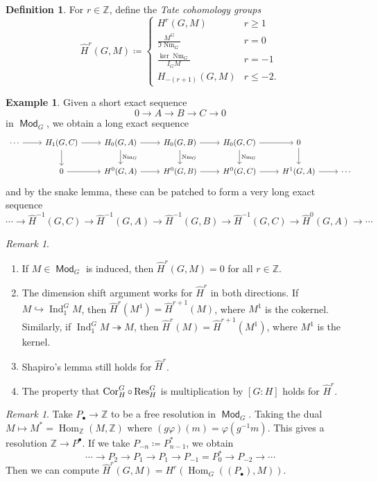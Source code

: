 \documentclass[leqno, openany]{memoir}
\theoremstyle{definition}
\newtheorem{defn}[thm]{Definition}
\newtheorem{exm}[thm]{Example}
\theoremstyle{remark}
\newtheorem{rmk}[thm]{Remark}
\theoremstyle{plain}
\theoremstyle{definition}
\theoremstyle{remark}
\newcommand{\Z}{\mathbb{Z}}
\newcommand{\wh}[1]{\widehat{#1}}
\DeclareMathOperator{\Hom}{Hom}
\DeclareMathOperator{\Mod}{\mathsf{Mod}}
\DeclareMathOperator{\Ind}{Ind}
\DeclareMathOperator{\Cor}{Cor}
\DeclareMathOperator{\Nm}{Nm}
\begin{document}
\begin{defn} For $r \in \Z$, define the \textit{Tate cohomology groups} \[
    \wh{H}^r(G, M) \coloneqq \begin{cases} H^r(G, M) & r \geq 1 \\
    \frac{M^G}{\Im \Nm_G} & r = 0 \\ \frac{\ker \Nm_G}{I_G M} & r = -1 \\
H_{-(r+1)}(G, M) & r \leq -2.  \end{cases} \] \end{defn}

\begin{exm} Given a short exact sequence \[ 0 \to A \to B \to C \to 0 \] in
$\Mod_G$, we obtain a long exact sequence \begin{equation*} \begin{tikzcd}
    \cdots \ar{r} & H_1(G, C) \ar{d} \ar{r} & H_0(G, A) \ar{r} \ar{d}{\Nm_G} &
    H_0(G, B) \ar{r} \ar{d}{\Nm_G} & H_0(G, C) \ar{r} \ar{d}{\Nm_G} & 0 \ar{d}
    \\ & 0 \ar{r} & H^0(G, A) \ar{r} & H^0(G, B) \ar{r} & H^0(G, C) \ar{r} &
    H^1(G, A) \ar{r} & \cdots \end{tikzcd} \end{equation*} and by the snake
    lemma, these can be patched to form a very long exact sequence \[ \cdots
    \to \wh{H}^{-1}(G, C) \to \wh{H}^{-1}(G, A) \to \wh{H}^{-1}(G, B) \to
\wh{H}^{-1}(G, C) \to \wh{H}^0(G, A) \to \cdots \] \end{exm}

\begin{rmk}\leavevmode \begin{enumerate} \item If $M \in \Mod_G$ is induced,
    then $\wh{H}^r(G, M) = 0$ for all $r \in \Z$.  \item The dimension shift
    argument works for $\wh{H}^r$ in both directions. If $M \hookrightarrow
    \Ind_1^G M$, then $\wh{H}^r(M^1) = \wh{H}^{r+1}(M)$, where $M^1$ is the
    cokernel. Similarly, if $\Ind_1^G M \twoheadrightarrow M$, then
    $\wh{H}^r(M) = \wh{H}^{r+1}(M^1)$, where $M^1$ is the kernel.  \item
    Shapiro's lemma still holds for $\wh{H}^r$.  \item The property that
    $\Cor_H^G \circ \Res_H^G$ is multiplication by $[G:H]$ holds for
    $\wh{H}^r$.  \end{enumerate} \end{rmk}

\begin{rmk} Take $P_{\bullet} \to \Z$ to be a free resolution in $\Mod_G$.
    Taking the dual $M \mapsto M^* = \Hom_{\Z}(M, \Z)$ where $(g \varphi)(m) =
    \varphi(g^{-1}m)$. This gives a resolution $\Z \to P^{\bullet}$. If we take
    $P_{-n} \coloneqq P_{n-1}^*$, we obtain \[ \cdots \to P_2 \to P_1 \to P_1
    \to P_{-1} = P_0^* \to P_{-2} \to \cdots \] Then we can compute
$\wh{H}^r(G, M) = H^r(\Hom_G({(P_{\bullet})}, M))$.  \end{rmk}
\end{document}
